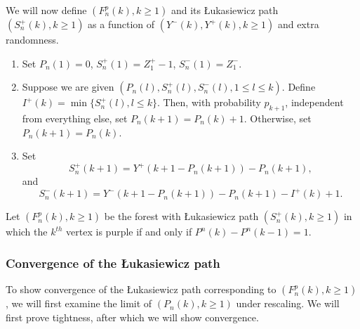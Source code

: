 We will now define $(F_n^p(k),k\geq 1)$ and its \L ukasiewicz path $(S_n^{+}(k), k\geq 1)$ as a function of $(Y^-(k), Y^+(k) ,k\geq 1)$ and extra randomness.
\begin{enumerate} 
    \item Set $P_n(1)=0$, $S_n^{+}(1)=Z_1^+-1$, $S_n^{-}(1)=Z_1^-$. 
    \item Suppose we are given $(P_n(l),S_n^{+}(l),S_n^{-}(l), 1\leq l \leq k)$. Define 
    $I^{+}(k)=\min\{S_n^{+}(l), l\leq k\}$. Then, with probability $p_{k+1}$, independent from everything else, set $P_n(k+1)=P_n(k)+1$. Otherwise, set $P_n(k+1)=P_n(k)$. 
    \item Set $$S_n^{+}(k+1)=Y^+(k+1-P_n(k+1))-P_n(k+1),$$ and $$S_n^{-}(k+1)=Y^-(k+1-P_n(k+1))-P_n(k+1)-I^{+}(k)+1.$$
\end{enumerate}
Let $(F^p_n(k),k\geq 1)$ be the forest with \L ukasiewicz path $(S_n^{+}(k), k\geq 1)$ in which the $k^{th}$ vertex is purple if and only if $P^n(k)-P^n(k-1)=1$. 
\subsubsection{Convergence of the \L ukasiewicz path}
To show convergence of the \L ukasiewicz path corresponding to $(F^p_n(k),k\geq 1)$, we will first examine the limit of $(P_n(k), k\geq 1)$ under rescaling. We will first prove tightness, after which we will show convergence.


